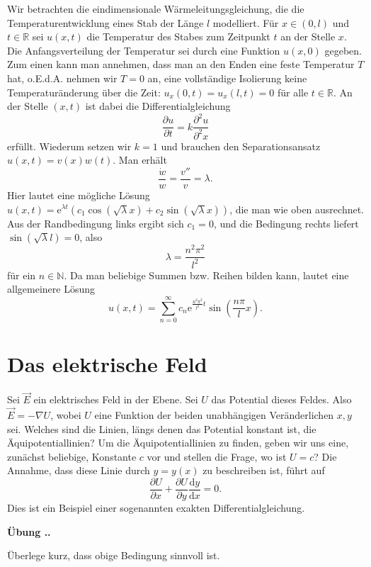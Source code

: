 \documentclass[%
11pt,%
twoside,%
titlepage,%
swissgerman,%
headsepline%
]{scrartcl}
\newcommand{\faEyeLightGray}{\textcolor{lightgray}{\faEye}} %
\newcommand{\definition}[1]{\colorbox{emerald}{#1}}
\theoremstyle{definition}
\theoremstyle{plain}
\newcommand{\concatueb}[1]{ueb:#1}%
\newcommand{\concatlsg}[1]{lsg:#1}%
\newcounter{uebcounter}[section]
\renewcommand{\theuebcounter}{\thesection.\arabic{uebcounter}}  %
\newenvironment{uebenv}[1]{%
    \refstepcounter{uebcounter}
    \par\noindent\textbf{Übung \theuebcounter.}%
    \label{\concatueb{#1}}\hfill\hyperref[\concatlsg{#1}]{\faEyeLightGray}\par
}{%
    \par
}
\begin{document}
Wir betrachten die eindimensionale Wärme\-lei\-tungs\-gleichung, die die Temperaturentwicklung eines Stab der Länge $l$ modelliert. Für $x\in(0,l)$ und $t\in\mathbb{R}$ sei $u(x,t)$ die Temperatur des Stabes zum Zeitpunkt $t$ an der Stelle $x$. Die Anfangsverteilung der Temperatur sei durch eine Funktion $u(x,0)$ gegeben. Zum einen kann man annehmen, dass man an den Enden eine feste Temperatur $T$ hat, o.E.d.A. nehmen wir $T=0$
an, eine vollständige Isolierung keine Temperaturänderung über die Zeit: $u_x(0,t)=u_x(l,t)=0$ für alle $t\in\mathbb{R}$. An der
Stelle $(x,t)$ ist dabei die Differentialgleichung
$$\frac{\partial u}{\partial t}=k\frac{\partial^2 u}{\partial^2 x}$$
erfüllt. Wiederum setzen wir $k=1$ und brauchen den Separationsansatz $u(x,t)=v(x)w(t)$. Man erhält
$$\frac{\dot{w}}{w}=\frac{v''}{v}=\lambda.$$
Hier lautet eine mögliche Lösung $u(x,t)=\mathrm{e}^{\lambda t}(c_1\cos(\sqrt{\lambda}x)+c_2\sin(\sqrt{\lambda}x))$, die man wie oben ausrechnet. Aus der Randbedingung links ergibt sich $c_1=0$, und die Bedingung rechts liefert $\sin(\sqrt{\lambda}l)=0$, also
$$\lambda=\frac{n^2\pi^2}{l^2}$$
für ein $n\in\mathbb{N}$. Da man beliebige Summen bzw. Reihen bilden kann, lautet eine allgemeinere Lösung
$$u(x,t)=\sum_{n=0}^\infty c_n\mathrm{e}^{\frac{n^2\pi^2}{l^2}t}\sin\left(\frac{n\pi}{l}x\right).$$

\clearpage

\section{Das elektrische Feld}

Sei $\vec{E}$ ein elektrisches Feld in der Ebene.
Sei $U$ das Potential dieses Feldes. Also $\vec{E}=-\nabla U$, wobei $U$ eine Funktion der beiden unabhängigen Veränderlichen $x,y$ sei. Welches sind die Linien, längs denen das Potential konstant ist, die \definition{Äquipotentiallinien}?
Um die Äquipotentiallinien zu finden, geben wir uns eine, zunächst beliebige, Konstante $c$ vor und stellen die Frage, wo ist $U=c$? Die Annahme, dass diese Linie durch $y = y(x)$ zu beschreiben ist, führt auf
$$\frac{\partial U}{\partial x}+\frac{\partial U}{\partial y}\frac{\mathrm{d}y}{\mathrm{d}x}=0.$$
Dies ist ein Beispiel einer sogenannten exakten Differentialgleichung.

\begin{uebenv}{efeldexakt}
Überlege kurz, dass obige Bedingung sinnvoll ist.
\end{uebenv}
\end{document}
